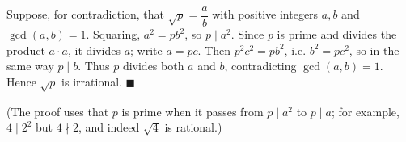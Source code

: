 Suppose, for contradiction, that $\sqrt p=\dfrac {a}{b}$ with positive integers $a,b$ and $\gcd(a,b)=1$. Squaring, $a^2=pb^2$, so $p\mid a^2$. Since $p$ is prime and divides the product $a\cdot a$, it divides $a$; write $a=pc$. Then $p^2c^2=pb^2$, i.e. $b^2=pc^2$, so in the same way $p\mid b$. Thus $p$ divides both $a$ and $b$, contradicting $\gcd(a,b)=1$. Hence $\sqrt p$ is irrational. $\blacksquare$

(The proof uses that $p$ is prime when it passes from $p\mid a^2$ to $p\mid a$; for example, $4\mid 2^2$ but $4\nmid2$, and indeed $\sqrt4$ is rational.)
